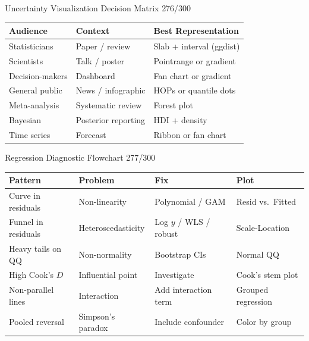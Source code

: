 \documentclass[10pt]{beamer}
\newcommand{\smark}[1]{\hfill{\scriptsize\color{codegray}#1}}
\begin{document}
\begin{frame}{Uncertainty Visualization Decision Matrix}
\smark{276/300}
\centering\small
\begin{tabular}{@{}lll@{}}
    \toprule
    \textbf{Audience} & \textbf{Context} & \textbf{Best Representation} \\
    \midrule
    Statisticians        & Paper / review      & Slab + interval (ggdist) \\
    Scientists           & Talk / poster       & Pointrange or gradient \\
    Decision-makers      & Dashboard           & Fan chart or gradient \\
    General public       & News / infographic  & HOPs or quantile dots \\
    Meta-analysis        & Systematic review   & Forest plot \\
    Bayesian             & Posterior reporting  & HDI + density \\
    Time series          & Forecast            & Ribbon or fan chart \\
    \bottomrule
\end{tabular}
\end{frame}

\begin{frame}{Regression Diagnostic Flowchart}
\smark{277/300}
\centering\small
\begin{tabular}{@{}llll@{}}
    \toprule
    \textbf{Pattern} & \textbf{Problem} & \textbf{Fix} & \textbf{Plot} \\
    \midrule
    Curve in residuals       & Non-linearity     & Polynomial / GAM        & Resid vs.\ Fitted \\
    Funnel in residuals      & Heteroscedasticity& Log $y$ / WLS / robust  & Scale-Location \\
    Heavy tails on QQ        & Non-normality     & Bootstrap CIs           & Normal QQ \\
    High Cook's $D$          & Influential point & Investigate              & Cook's stem plot \\
    Non-parallel lines       & Interaction       & Add interaction term     & Grouped regression \\
    Pooled reversal          & Simpson's paradox & Include confounder       & Color by group \\
    \bottomrule
\end{tabular}
\end{frame}
\end{document}
